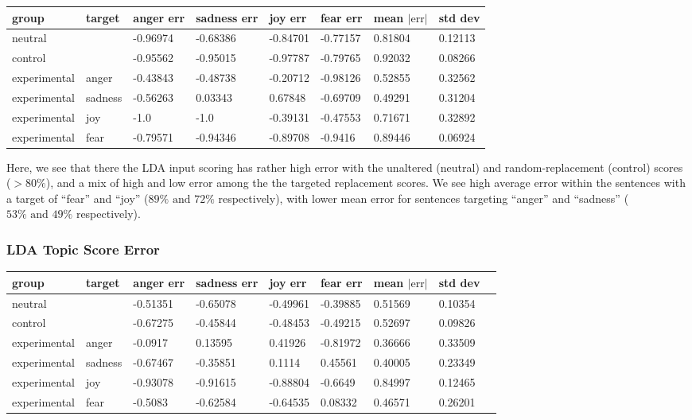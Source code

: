 \documentclass[11pt, twoside, reqno]{book}
\begin{document}
\begin{tabular}{|l|l|l|l|l|l|l|l|}
\hline
    group & target & anger err & sadness err & joy err & fear err & mean $|\text{err}|$ & std dev \\ \hline
    neutral &  & -0.96974 & -0.68386 & -0.84701 & -0.77157 & 0.81804 & 0.12113 \\ \hline
    control &  & -0.95562 & -0.95015 & -0.97787 & -0.79765 & 0.92032 & 0.08266 \\ \hline
    experimental & anger & -0.43843 & -0.48738 & -0.20712 & -0.98126 & 0.52855 & 0.32562 \\ \hline
    experimental & sadness & -0.56263 & 0.03343 & 0.67848 & -0.69709 & 0.49291 & 0.31204 \\ \hline
    experimental & joy & -1.0 & -1.0 & -0.39131 & -0.47553 & 0.71671 & 0.32892 \\ \hline
    experimental & fear & -0.79571 & -0.94346 & -0.89708 & -0.9416 & 0.89446 & 0.06924 \\ \hline
\end{tabular}
\vspace{16pt}

Here, we see that there the LDA input scoring has rather high error with the unaltered (neutral) and random-replacement (control) scores ($>80\%$), and a mix of high and low error among the the targeted replacement scores. We see high average error within the sentences with a target of ``fear'' and ``joy'' ($89\% \text{ and } 72\%$ respectively), with lower mean error for sentences targeting ``anger'' and ``sadness'' ($53\% \text{ and } 49\%$ respectively).

\subsubsection{\textbf{LDA Topic Score Error}}

\begin{tabular}{|l|l|l|l|l|l|l|l|l|}
\hline
    group & target & anger err & sadness err & joy err & fear err & mean $|\text{err}|$ & std dev  \\ \hline
    neutral &  & -0.51351 & -0.65078 & -0.49961 & -0.39885 & 0.51569 & 0.10354  \\ \hline
    control &  & -0.67275 & -0.45844 & -0.48453 & -0.49215 & 0.52697 & 0.09826  \\ \hline
    experimental & anger & -0.0917 & 0.13595 & 0.41926 & -0.81972 & 0.36666 & 0.33509  \\ \hline
    experimental & sadness & -0.67467 & -0.35851 & 0.1114 & 0.45561 & 0.40005 & 0.23349  \\ \hline
    experimental & joy & -0.93078 & -0.91615 & -0.88804 & -0.6649 & 0.84997 & 0.12465  \\ \hline
    experimental & fear & -0.5083 & -0.62584 & -0.64535 & 0.08332 & 0.46571 & 0.26201  \\ \hline
\end{tabular}
\vspace{16pt}
\end{document}
